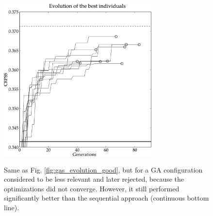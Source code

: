 \documentclass{ametsoc}
\begin{document}
\begin{figure}[t]
	\begin{center}
		\noindent\includegraphics[width=19pc,angle=0]{fig06.pdf}\\
	\end{center}
	\caption{Same as Fig. \ref{fig:gas_evolution_good}, but for a GA configuration considered to be less relevant and later rejected, because the optimizations did not converge. However, it still performed significantly better than the sequential approach (continuous bottom line).}
	\label{fig:gas_evolution_bad}
\end{figure}
\end{document}
